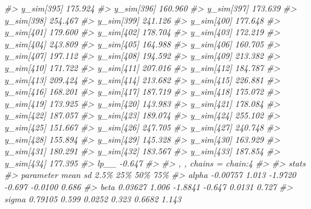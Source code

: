 \documentclass[
  10pt,
  italian,
  a4paper,
  extrafontsizes,onecolumn,openright
  ]{memoir}
\newenvironment{Shaded}{\begin{snugshade}}{\end{snugshade}}
\newcommand{\CommentTok}[1]{\textcolor[rgb]{0.56,0.35,0.01}{\textit{#1}}}
\begin{document}
\begin{Shaded}
\begin{Highlighting}[]
\CommentTok{\#\textgreater{}   y\_sim[395] 175.924}
\CommentTok{\#\textgreater{}   y\_sim[396] 160.960}
\CommentTok{\#\textgreater{}   y\_sim[397] 173.639}
\CommentTok{\#\textgreater{}   y\_sim[398] 254.467}
\CommentTok{\#\textgreater{}   y\_sim[399] 241.126}
\CommentTok{\#\textgreater{}   y\_sim[400] 177.648}
\CommentTok{\#\textgreater{}   y\_sim[401] 179.600}
\CommentTok{\#\textgreater{}   y\_sim[402] 178.704}
\CommentTok{\#\textgreater{}   y\_sim[403] 172.219}
\CommentTok{\#\textgreater{}   y\_sim[404] 243.809}
\CommentTok{\#\textgreater{}   y\_sim[405] 164.988}
\CommentTok{\#\textgreater{}   y\_sim[406] 160.705}
\CommentTok{\#\textgreater{}   y\_sim[407] 197.112}
\CommentTok{\#\textgreater{}   y\_sim[408] 194.592}
\CommentTok{\#\textgreater{}   y\_sim[409] 213.382}
\CommentTok{\#\textgreater{}   y\_sim[410] 171.722}
\CommentTok{\#\textgreater{}   y\_sim[411] 207.016}
\CommentTok{\#\textgreater{}   y\_sim[412] 184.787}
\CommentTok{\#\textgreater{}   y\_sim[413] 209.424}
\CommentTok{\#\textgreater{}   y\_sim[414] 213.682}
\CommentTok{\#\textgreater{}   y\_sim[415] 226.881}
\CommentTok{\#\textgreater{}   y\_sim[416] 168.201}
\CommentTok{\#\textgreater{}   y\_sim[417] 187.719}
\CommentTok{\#\textgreater{}   y\_sim[418] 175.072}
\CommentTok{\#\textgreater{}   y\_sim[419] 173.925}
\CommentTok{\#\textgreater{}   y\_sim[420] 143.983}
\CommentTok{\#\textgreater{}   y\_sim[421] 178.084}
\CommentTok{\#\textgreater{}   y\_sim[422] 187.057}
\CommentTok{\#\textgreater{}   y\_sim[423] 189.074}
\CommentTok{\#\textgreater{}   y\_sim[424] 255.102}
\CommentTok{\#\textgreater{}   y\_sim[425] 151.667}
\CommentTok{\#\textgreater{}   y\_sim[426] 247.705}
\CommentTok{\#\textgreater{}   y\_sim[427] 240.748}
\CommentTok{\#\textgreater{}   y\_sim[428] 155.894}
\CommentTok{\#\textgreater{}   y\_sim[429] 145.328}
\CommentTok{\#\textgreater{}   y\_sim[430] 163.929}
\CommentTok{\#\textgreater{}   y\_sim[431] 180.291}
\CommentTok{\#\textgreater{}   y\_sim[432] 183.567}
\CommentTok{\#\textgreater{}   y\_sim[433] 187.854}
\CommentTok{\#\textgreater{}   y\_sim[434] 177.395}
\CommentTok{\#\textgreater{}   lp\_\_        {-}0.647}
\CommentTok{\#\textgreater{} }
\CommentTok{\#\textgreater{} , , chains = chain:4}
\CommentTok{\#\textgreater{} }
\CommentTok{\#\textgreater{}             stats}
\CommentTok{\#\textgreater{} parameter        mean      sd      2.5\%     25\%     50\%     75\%}
\CommentTok{\#\textgreater{}   alpha      {-}0.00757   1.013   {-}1.9720  {-}0.697 {-}0.0100   0.686}
\CommentTok{\#\textgreater{}   beta        0.03627   1.006   {-}1.8841  {-}0.647  0.0131   0.727}
\CommentTok{\#\textgreater{}   sigma       0.79105   0.599    0.0252   0.323  0.6682   1.143}

\end{Highlighting}
\end{Shaded}
\end{document}
